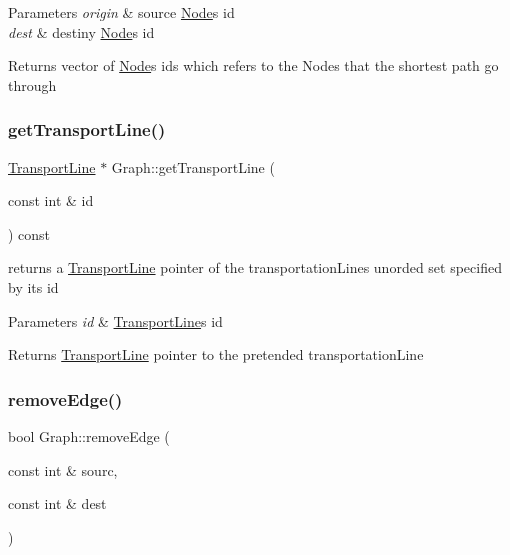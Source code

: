 \begin{DoxyParams}{Parameters}
{\em origin} & source \hyperlink{class_node}{Node}\textquotesingle{}s id \\
\hline
{\em dest} & destiny \hyperlink{class_node}{Node}\textquotesingle{}s id \\
\hline
\end{DoxyParams}
\begin{DoxyReturn}{Returns}
vector of \hyperlink{class_node}{Node}\textquotesingle{}s ids which refers to the Nodes that the shortest path go through 
\end{DoxyReturn}
\mbox{\label{class_graph_a5256503fd14b7a56bce1da737ec223c1}} 
\subsubsection{\texorpdfstring{get\+Transport\+Line()}{getTransportLine()}}
{\footnotesize\ttfamily \hyperlink{class_transport_line}{Transport\+Line} $\ast$ Graph\+::get\+Transport\+Line (\begin{DoxyParamCaption}\item[{const int \&}]{id }\end{DoxyParamCaption}) const}



returns a \hyperlink{class_transport_line}{Transport\+Line} pointer of the transportation\+Lines unorded set specified by its id 


\begin{DoxyParams}{Parameters}
{\em id} & \hyperlink{class_transport_line}{Transport\+Line}\textquotesingle{}s id \\
\hline
\end{DoxyParams}
\begin{DoxyReturn}{Returns}
\hyperlink{class_transport_line}{Transport\+Line} pointer to the pretended transportation\+Line 
\end{DoxyReturn}
\mbox{\label{class_graph_a7a5c1d9d236c0adb8bb3a97dfde7e0bb}} 
\subsubsection{\texorpdfstring{remove\+Edge()}{removeEdge()}}
{\footnotesize\ttfamily bool Graph\+::remove\+Edge (\begin{DoxyParamCaption}\item[{const int \&}]{sourc,  }\item[{const int \&}]{dest }\end{DoxyParamCaption})}



